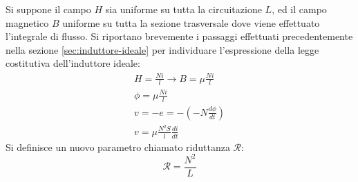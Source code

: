 \documentclass{article}
\numberwithin{equation}{subsection}
\begin{document}
Si suppone il campo $H$ sia uniforme su tutta la circuitazione $L$, ed il campo magnetico $B$ uniforme su tutta la sezione trasversale dove viene effettuato l'integrale 
di flusso. Si riportano brevemente i passaggi effettuati precedentemente nella sezione \ref{sec:induttore-ideale} per individuare l'espressione della legge costitutiva 
dell'induttore ideale: 
\begin{gather*}
    H=\displaystyle\frac{Ni}{l}\to B=\mu\displaystyle\frac{Ni}{l}\\
    \phi=\mu\displaystyle\frac{Ni}{l}\\
    v=-e=-\left(-N\displaystyle\frac{d\phi}{dt}\right)\\
    v=\displaystyle\mu\frac{N^2S}{l}\frac{di}{dt}
\end{gather*}
Si definisce un nuovo parametro chiamato riduttanza $\mathscr{R}$:
\begin{equation}
    \mathscr{R}=\displaystyle\frac{N^2}{L}
\end{equation}
\end{document}
